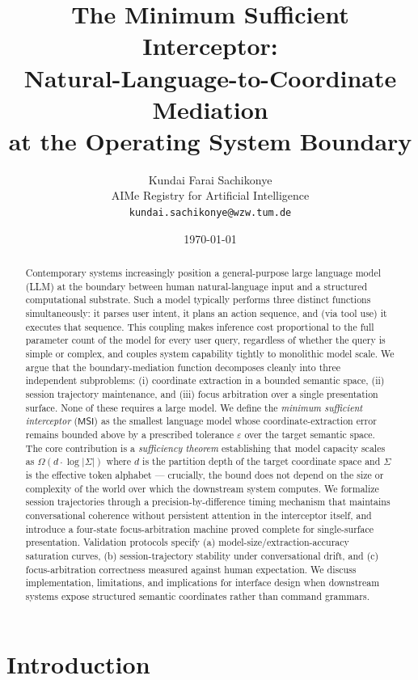 \documentclass[11pt,twocolumn,a4paper]{article}
\title{The Minimum Sufficient Interceptor:\\
Natural-Language-to-Coordinate Mediation\\
at the Operating System Boundary}
\author{
Kundai Farai Sachikonye\\
AIMe Registry for Artificial Intelligence\\
\texttt{kundai.sachikonye@wzw.tum.de}
}
\date{\today}
\theoremstyle{definition}
\theoremstyle{remark}
\newcommand{\MSI}{\mathsf{MSI}}
\begin{document}
\maketitle

\begin{abstract}
Contemporary systems increasingly position a general-purpose large language model (LLM) at the boundary between human natural-language input and a structured computational substrate. Such a model typically performs three distinct functions simultaneously: it parses user intent, it plans an action sequence, and (via tool use) it executes that sequence. This coupling makes inference cost proportional to the full parameter count of the model for every user query, regardless of whether the query is simple or complex, and couples system capability tightly to monolithic model scale. We argue that the boundary-mediation function decomposes cleanly into three independent subproblems: (i) coordinate extraction in a bounded semantic space, (ii) session trajectory maintenance, and (iii) focus arbitration over a single presentation surface. None of these requires a large model. We define the \emph{minimum sufficient interceptor} ($\MSI$) as the smallest language model whose coordinate-extraction error remains bounded above by a prescribed tolerance $\varepsilon$ over the target semantic space. The core contribution is a \emph{sufficiency theorem} establishing that model capacity scales as $\Omega(d \cdot \log |\Sigma|)$ where $d$ is the partition depth of the target coordinate space and $\Sigma$ is the effective token alphabet --- crucially, the bound does not depend on the size or complexity of the world over which the downstream system computes. We formalize session trajectories through a precision-by-difference timing mechanism that maintains conversational coherence without persistent attention in the interceptor itself, and introduce a four-state focus-arbitration machine proved complete for single-surface presentation. Validation protocols specify (a) model-size/extraction-accuracy saturation curves, (b) session-trajectory stability under conversational drift, and (c) focus-arbitration correctness measured against human expectation. We discuss implementation, limitations, and implications for interface design when downstream systems expose structured semantic coordinates rather than command grammars.
\end{abstract}

\section{Introduction}
\label{sec:intro}
\end{document}
